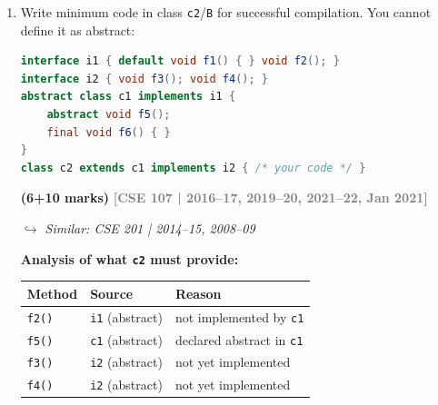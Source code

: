 \documentclass[12pt,a3paper]{article}
\newcommand{\yr}[1]{\hfill\textcolor{gray}{\small\textbf{[#1]}}}
\newcommand{\mk}[1]{\textcolor{orange!70!black}{\small\textbf{(#1 marks)}}}
\newcommand{\variant}[1]{\par\vspace{1pt}\textcolor{blue!50!black}%
  {\footnotesize\textit{$\hookrightarrow$ Similar: #1}}}
\begin{document}
\begin{enumerate}
\begin{tcolorbox}
\begin{lstlisting}[language=Java]
interface i1 { void f1(); void f2(); }
interface i2 extends i1 { void f3(); void f4(); }
interface i3 extends i2 { void f5(); void f6(); void f7(); }

abstract class A implements i3 {
    // implements f1..f6 concretely, declares f7 abstract
    public void f1() { System.out.println("f1"); }
    public void f2() { System.out.println("f2"); }
    public void f3() { System.out.println("f3"); }
    public void f4() { System.out.println("f4"); }
    public void f5() { System.out.println("f5"); }
    public void f6() { System.out.println("f6"); }
    public abstract void f7();   // <= 1 abstract method in A
}

class MyClass extends A {        // implements no interface directly
    public void f7() { System.out.println("f7"); }
}
\end{lstlisting}

\end{tcolorbox}

\item Write minimum code in class \texttt{c2}/\texttt{B} for successful compilation. You cannot define it as abstract:
\begin{lstlisting}[language=Java]
interface i1 { default void f1() { } void f2(); }
interface i2 { void f3(); void f4(); }
abstract class c1 implements i1 {
    abstract void f5();
    final void f6() { }
}
class c2 extends c1 implements i2 { /* your code */ }
\end{lstlisting}
\mk{6+10}
\yr{CSE 107 | 2016--17, 2019--20, 2021--22, Jan 2021}
\variant{CSE 201 | 2014--15, 2008--09}

\begin{tcolorbox}[enhanced,breakable,ansbox,
  colback=cD!4,colframe=cD,boxrule=0.8pt,arc=5pt,
  title={\textbf{Answer --- Minimum Code for \texttt{c2}}},
  fonttitle=\bfseries\color{white},colbacktitle=cD]

\textbf{Analysis of what \texttt{c2} must provide:}

\begin{center}
\small
\begin{tabular}{@{}lll@{}}
\toprule
\textbf{Method} & \textbf{Source} & \textbf{Reason} \\
\midrule
\texttt{f2()} & \texttt{i1} (abstract) & not implemented by \texttt{c1} \\
\texttt{f5()} & \texttt{c1} (abstract) & declared abstract in \texttt{c1} \\
\texttt{f3()} & \texttt{i2} (abstract) & not yet implemented \\
\texttt{f4()} & \texttt{i2} (abstract) & not yet implemented \\
\bottomrule
\end{tabular}
\end{center}


\end{tcolorbox}
\end{enumerate}
\end{document}
